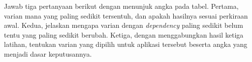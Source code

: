 Jawab tiga pertanyaan berikut dengan menunjuk angka pada tabel. Pertama, varian
mana yang paling sedikit tersentuh, dan apakah hasilnya sesuai perkiraan awal.
Kedua, jelaskan mengapa varian dengan \textit{dependency} paling sedikit belum tentu
yang paling sedikit berubah. Ketiga, dengan menggabungkan hasil ketiga latihan,
tentukan varian yang dipilih untuk aplikasi tersebut beserta angka yang menjadi
dasar keputusannya.
